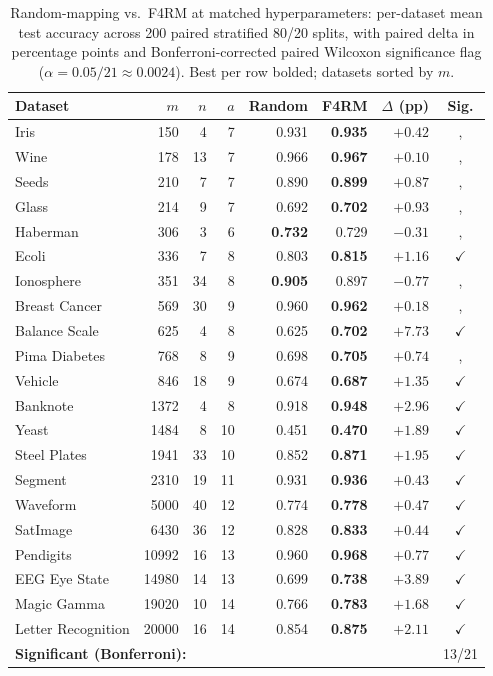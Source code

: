 \begin{table}[ht!]
 \centering
 \caption{Random-mapping vs.~F4RM at matched hyperparameters: per-dataset mean test accuracy across 200 paired stratified 80/20 splits, with paired delta in percentage points and Bonferroni-corrected paired Wilcoxon significance flag ($\alpha = 0.05/21 \approx 0.0024$). Best per row bolded; datasets sorted by $m$.}
 \label{tab:main-results}
 \setlength{\tabcolsep}{5pt}
 \footnotesize
 \begin{tabular}{lrrrrrrc}
 \toprule
 Dataset & $m$ & $n$ & $a$ & Random & F4RM & $\Delta$ (pp) & Sig. \\
 \midrule
 Iris & 150 & 4 & 7 & 0.931 & \textbf{0.935} & $+0.42$ &, \\
 Wine & 178 & 13 & 7 & 0.966 & \textbf{0.967} & $+0.10$ &, \\
 Seeds & 210 & 7 & 7 & 0.890 & \textbf{0.899} & $+0.87$ &, \\
 Glass & 214 & 9 & 7 & 0.692 & \textbf{0.702} & $+0.93$ &, \\
 Haberman & 306 & 3 & 6 & \textbf{0.732} & 0.729 & $-0.31$ &, \\
 Ecoli & 336 & 7 & 8 & 0.803 & \textbf{0.815} & $+1.16$ & $\checkmark$ \\
 Ionosphere & 351 & 34 & 8 & \textbf{0.905} & 0.897 & $-0.77$ &, \\
 Breast Cancer & 569 & 30 & 9 & 0.960 & \textbf{0.962} & $+0.18$ &, \\
 Balance Scale & 625 & 4 & 8 & 0.625 & \textbf{0.702} & $+7.73$ & $\checkmark$ \\
 Pima Diabetes & 768 & 8 & 9 & 0.698 & \textbf{0.705} & $+0.74$ &, \\
 Vehicle & 846 & 18 & 9 & 0.674 & \textbf{0.687} & $+1.35$ & $\checkmark$ \\
 Banknote & 1372 & 4 & 8 & 0.918 & \textbf{0.948} & $+2.96$ & $\checkmark$ \\
 Yeast & 1484 & 8 & 10 & 0.451 & \textbf{0.470} & $+1.89$ & $\checkmark$ \\
 Steel Plates & 1941 & 33 & 10 & 0.852 & \textbf{0.871} & $+1.95$ & $\checkmark$ \\
 Segment & 2310 & 19 & 11 & 0.931 & \textbf{0.936} & $+0.43$ & $\checkmark$ \\
 Waveform & 5000 & 40 & 12 & 0.774 & \textbf{0.778} & $+0.47$ & $\checkmark$ \\
 SatImage & 6430 & 36 & 12 & 0.828 & \textbf{0.833} & $+0.44$ & $\checkmark$ \\
 Pendigits & 10992 & 16 & 13 & 0.960 & \textbf{0.968} & $+0.77$ & $\checkmark$ \\
 EEG Eye State & 14980 & 14 & 13 & 0.699 & \textbf{0.738} & $+3.89$ & $\checkmark$ \\
 Magic Gamma & 19020 & 10 & 14 & 0.766 & \textbf{0.783} & $+1.68$ & $\checkmark$ \\
 Letter Recognition & 20000 & 16 & 14 & 0.854 & \textbf{0.875} & $+2.11$ & $\checkmark$ \\
 \midrule
 \multicolumn{7}{l}{\textbf{Significant (Bonferroni):}} & 13/21 \\
 \bottomrule
 \end{tabular}
\end{table}

